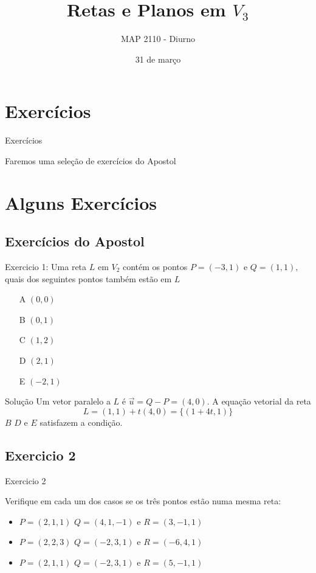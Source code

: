 \documentclass{beamer}
\title[Retas e Planos]{Retas e Planos em $V_3$}
\author{MAP 2110 - Diurno}
\institute{IME USP}
\date{31 de março}
\begin{document}
\begin{frame}
  \titlepage
\end{frame}


\section {Exercícios}

\begin{frame}{Exercícios}
 
 Faremos uma seleção de exercícios do Apostol

\end{frame}

\section{Alguns Exercícios}

\subsection{Exercícios do Apostol}

\begin{frame}{Exercicio 1:}
Uma reta $L$ em $V_2$ contém os pontos $P=(-3,1)$ e $Q=(1,1),$ quais dos seguintes pontos também estão em $L$
\begin{itemize}
   \item[A]$(0,0)$
   \item[B]$(0,1)$
   \item[C]$(1,2)$
   \item[D]$(2,1)$
   \item[E]$(-2,1)$
\end{itemize}
\end{frame}
\begin{frame}{Solução}
  Um vetor paralelo a $L$ é $\vec{u}=Q-P=(4,0)$.
  A equação vetorial da reta 
  $$L=(1,1)+t(4,0)= \{(1+4t,1)\}$$
  $B$ $D$ e $E$ satisfazem a condição.
\end{frame}


\subsection{Exercicio 2}

\begin{frame}{Exercicio 2}

Verifique em cada um dos casos se os três pontos estão numa mesma reta:
\begin{itemize}
    \item $P=(2,1,1)$ $Q=(4,1,-1)$ e $R=(3,-1,1)$
    \item $P=(2,2,3)$ $Q=(-2,3,1)$ e $R=(-6,4,1)$
    \item $P=(2,1,1)$ $Q=(-2,3,1)$ e $R=(5,-1,1)$
\end{itemize}

\end{frame}
\end{document}
